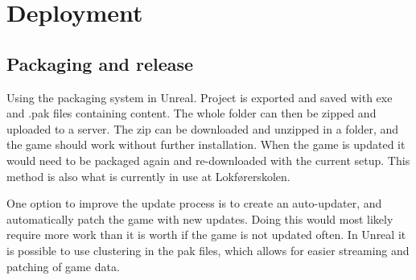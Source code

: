 \section{Deployment}

\subsection{Packaging and release}
%

Using the packaging system in Unreal. Project is exported and saved with exe and .pak files containing content. The whole folder can then be zipped and uploaded to a server. The zip can be downloaded and unzipped in a folder, and the game should work without further installation. When the game is updated it would need to be packaged again and re-downloaded with the current setup. This method is also what is currently in use at Lokførerskolen.

One option to improve the update process is to create an auto-updater, and automatically patch the game with new updates. Doing this would most likely require more work than it is worth if the game is not updated often. In Unreal it is possible to use clustering in the pak files, which allows for easier streaming and patching of game data. 